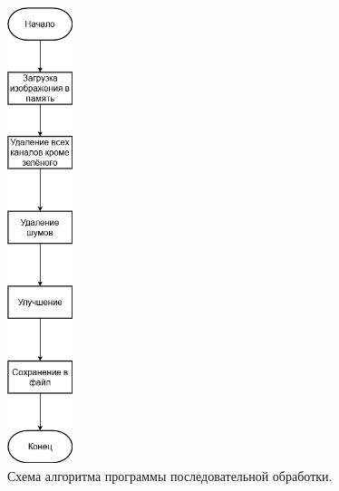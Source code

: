 \documentclass[14pt, a4paper, simple]{eskdtext}
\begin{document}
    
    \begin{figure}[ht]
        \begin{center}
            \includegraphics[width=0.17\textwidth]{../resources/shemas/shema1}
        \end{center}
        \caption{Схема алгоритма программы последовательной обработки.}
    \end{figure}
\end{document}
